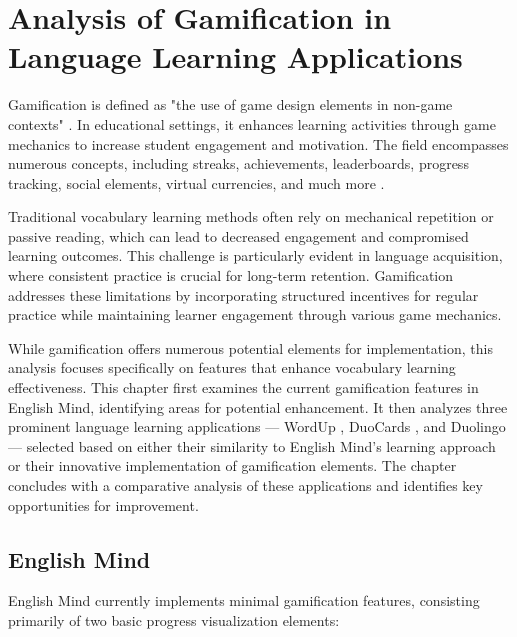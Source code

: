 \chapter{Analysis of Gamification in Language Learning Applications}

Gamification is defined as "the use of game design elements in non-game contexts" \cite{cite:deterding2011_gamefulness}. In educational settings, it enhances learning activities through game mechanics to increase student engagement and motivation. The field encompasses numerous concepts, including streaks, achievements, leaderboards, progress tracking, social elements, virtual currencies, and much more \cite{cite:govender2021_gamification_elements_in_language_learning_apps}.

Traditional vocabulary learning methods often rely on mechanical repetition or passive reading, which can lead to decreased engagement and compromised learning outcomes. This challenge is particularly evident in language acquisition, where consistent practice is crucial for long-term retention. Gamification addresses these limitations by incorporating structured incentives for regular practice while maintaining learner engagement through various game mechanics.

While gamification offers numerous potential elements for implementation, this analysis focuses specifically on features that enhance vocabulary learning effectiveness. This chapter first examines the current gamification features in English Mind, identifying areas for potential enhancement. It then analyzes three prominent language learning applications — WordUp \cite{cite:wordup}, DuoCards \cite{cite:duocards}, and Duolingo \cite{cite:duolingo} — selected based on either their similarity to English Mind's learning approach or their innovative implementation of gamification elements. The chapter concludes with a comparative analysis of these applications and identifies key opportunities for improvement.\newpage

\section{English Mind}

English Mind currently implements minimal gamification features, consisting primarily of two basic progress visualization elements:

